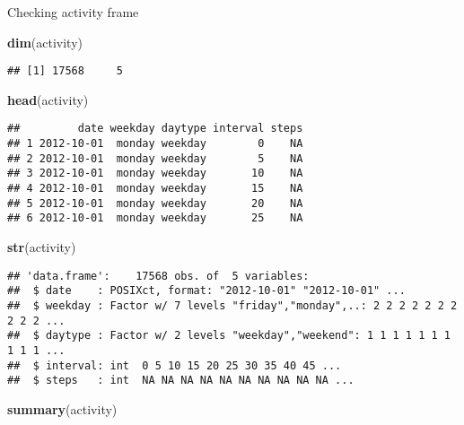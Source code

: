 \documentclass[]{article}
\newenvironment{Shaded}{\begin{snugshade}}{\end{snugshade}}
\newcommand{\KeywordTok}[1]{\textcolor[rgb]{0.13,0.29,0.53}{\textbf{#1}}}
\newcommand{\NormalTok}[1]{#1}
\begin{document}
Checking activity frame

\begin{Shaded}
\begin{Highlighting}[]
\KeywordTok{dim}\NormalTok{(activity)}
\end{Highlighting}
\end{Shaded}

\begin{verbatim}
## [1] 17568     5
\end{verbatim}

\begin{Shaded}
\begin{Highlighting}[]
\KeywordTok{head}\NormalTok{(activity)}
\end{Highlighting}
\end{Shaded}

\begin{verbatim}
##         date weekday daytype interval steps
## 1 2012-10-01  monday weekday        0    NA
## 2 2012-10-01  monday weekday        5    NA
## 3 2012-10-01  monday weekday       10    NA
## 4 2012-10-01  monday weekday       15    NA
## 5 2012-10-01  monday weekday       20    NA
## 6 2012-10-01  monday weekday       25    NA
\end{verbatim}

\begin{Shaded}
\begin{Highlighting}[]
\KeywordTok{str}\NormalTok{(activity)}
\end{Highlighting}
\end{Shaded}

\begin{verbatim}
## 'data.frame':    17568 obs. of  5 variables:
##  $ date    : POSIXct, format: "2012-10-01" "2012-10-01" ...
##  $ weekday : Factor w/ 7 levels "friday","monday",..: 2 2 2 2 2 2 2 2 2 2 ...
##  $ daytype : Factor w/ 2 levels "weekday","weekend": 1 1 1 1 1 1 1 1 1 1 ...
##  $ interval: int  0 5 10 15 20 25 30 35 40 45 ...
##  $ steps   : int  NA NA NA NA NA NA NA NA NA NA ...
\end{verbatim}

\begin{Shaded}
\begin{Highlighting}[]
\KeywordTok{summary}\NormalTok{(activity)}
\end{Highlighting}
\end{Shaded}
\end{document}

